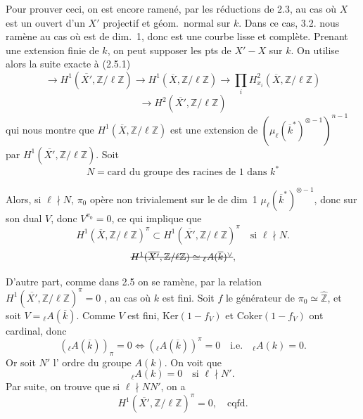 \documentclass[11pt,a4paper]{article}
\begin{document}
Pour prouver ceci, on est encore ramené, \struck{\ill{} \ill{}} par les réductions de 2.3, au cas où  $X$ est un ouvert d'un $X'$ projectif et géom.\ normal sur $k$. Dans ce cas, \struck{\ill{}} 3.2. nous ramène au cas où  est de dim.~1, donc est une courbe lisse et complète. \struck{\ill{} \ill{}} Prenant une extension finie de $k$, on peut supposer   les pts de $X' - X$  sur $k$. On utilise alors la suite exacte  à (2.5.1)
\[
  \to H^1(\overline{X'}, \mathbb{Z}/\ell\mathbb{Z}) \to H^1(\overline{X}, \mathbb{Z}/\ell\mathbb{Z}) \to \prod_i H^2_{x_i}(\overline{X}, \mathbb{Z}/\ell\mathbb{Z})
\]
\[
  \to H^2(\overline{X'}, \mathbb{Z}/\ell\mathbb{Z}) \tag{4.2.1}
\]
qui nous montre que $H^1(\overline{X}, \mathbb{Z}/\ell\mathbb{Z})$ est une extension de $\left(\mu_\ell(\overline{k}^*)^{\otimes -1}\right)^{n-1}$ par $H^1(\overline{X'}, \mathbb{Z}/\ell\mathbb{Z})$. \struck{\ill{}} Soit
\[
  N = \text{card du groupe des racines de 1 dans } k^* \tag{4.2.2}
\]

Alors, si \struck{\ill{}} $\ell \nmid N$,  $\pi_0$ opère non trivialement sur le  \struck{\ill{}} de dim~1 $\mu_\ell(\overline{k}^*)^{\otimes -1}$, donc sur son dual $V$, donc $V^{\pi_0} = 0$, ce qui implique que
\[
  H^1(\overline{X}, \mathbb{Z}/\ell\mathbb{Z})^{\pi} \subset H^1(\overline{X'}, \mathbb{Z}/\ell\mathbb{Z})^{\pi} \quad \text{si } \ell \nmid N . \tag{4.2.3}
\]
\[
  \text{\struck{$H^1(\overline{X'}, \mathbb{Z}/\ell\mathbb{Z}) \simeq {}_\ell A(\overline{k})^\vee$}} ,
\]

D'autre part,  comme dans 2.5 on se ramène, par la relation $H^1(\overline{X'}, \mathbb{Z}/\ell\mathbb{Z})^\pi = 0$ , \struck{\ill{}}  au cas où $k$ est fini.  Soit $f$ le générateur  de $\pi_0 \simeq \hat{\mathbb{Z}}$, et soit $V = {}_\ell A(\overline{k})$. Comme $V$ est fini, $\mathrm{Ker}(1-f_V)$ et $\mathrm{Coker}(1-f_V)$ ont  cardinal, donc 
\[
  ({}_\ell A(\overline{k}))_\pi = 0 \iff ({}_\ell A(\overline{k}))^\pi = 0 \quad \text{i.e.} \quad {}_\ell A(k) = 0 .
\]
Or soit $N'$ l'\struck{\ill{}} ordre du groupe  $A(k)$. On voit que
\[
  {}_\ell A(k) = 0 \quad \text{si } \ell \nmid N' .
\]
Par suite, on trouve que si $\ell \nmid NN'$, on a
\[
  H^1(\overline{X'}, \mathbb{Z}/\ell\mathbb{Z})^\pi = 0, \quad \text{cqfd.}
\]
\end{document}
